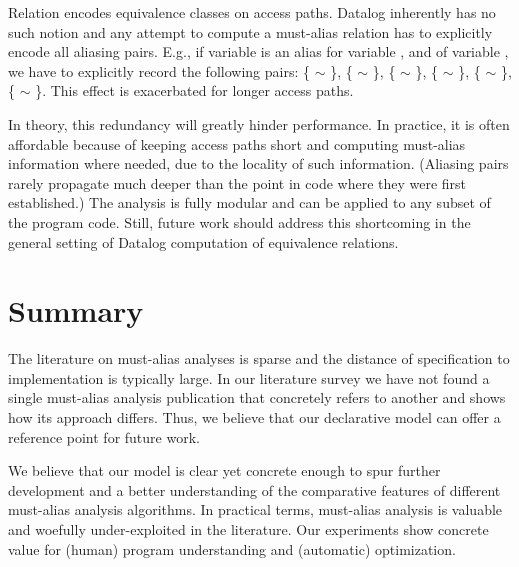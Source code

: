 \label{sec:must-logic:equivalence}
Relation  encodes equivalence classes on access paths. Datalog inherently has no such notion and any attempt to compute a must-alias relation has to explicitly encode all aliasing pairs. E.g., if variable  is an alias for variable , and  of variable , we have to explicitly record the following pairs: \{ $\sim$ \}, \{ $\sim$ \}, \{ $\sim$ \}, \{ $\sim$ \}, \{ $\sim$ \}, \{ $\sim$ \}. This effect is exacerbated for longer access paths.

In theory, this redundancy will greatly hinder performance. In practice, it is often affordable because of keeping access paths short and computing must-alias information where needed, due to the locality of such information. (Aliasing pairs rarely propagate much deeper than the point in code where they were first established.) The analysis is fully modular and can be applied to any subset of the program code. Still, future work should address this shortcoming in the general setting of Datalog computation of equivalence relations.


\section{Summary}

The literature on must-alias analyses is sparse and the distance of specification to implementation is typically large. In our literature survey we have not found a single must-alias analysis publication that concretely refers to another and shows how its approach differs. Thus, we believe that our declarative model can offer a reference point for future work.

We believe that our model is clear yet concrete enough to spur further development and a better understanding of the comparative features of different must-alias analysis algorithms. In practical terms, must-alias analysis is valuable and woefully under-exploited in the literature. Our experiments show concrete value for (human) program understanding and (automatic) optimization.